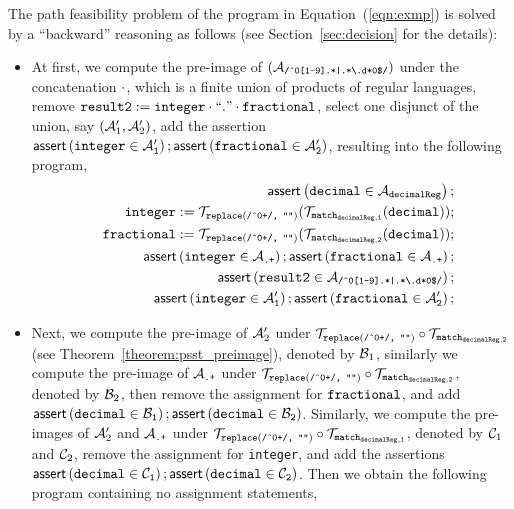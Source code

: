 The path feasibility problem of the program in Equation~(\ref{eqn:exmp}) is solved by a ``backward'' reasoning as follows (see Section~\ref{sec:decision} for the details):  
\begin{itemize}
\item At first, we compute the pre-image of $(\mathcal{A}_{\scriptsize\mbox{\tt /\^{}0[1-9].*|.*{\scriptsize\textbackslash}.d*0\$/}})$ under the concatenation $\cdot$, which is a finite union of products of regular languages, remove $\tt result2 := integer \cdot ``." \cdot fractional$, select one disjunct of the union, say $(\mathcal{A}'_1, \mathcal{A}'_2)$, add the assertion $\textsf{assert}\left(\tt integer \in \mathcal{A}'_1\right);\textsf{assert}\left(\tt fractional \in \mathcal{A}'_2\right)$, resulting into the following program,
\begin{eqnarray}\label{eqn:exmp-2}
& & \textsf{assert}\left(\tt decimal \in \mathcal{A}_{decimalReg}\right);\nonumber \\
& & \tt integer  := \tt  \mathcal{T}_{\tt replace(\mbox{\scriptsize \tt /\^{}0+/, ""})}(\mathcal{T}_{\tt match_{decimalReg,1}}(decimal));\nonumber \\
& & \tt fractional  := \tt  \mathcal{T}_{\scriptsize\tt replace(\mbox{\tt /\^{}0+/, ""})}(\mathcal{T}_{\tt match_{decimalReg,2}}(decimal));\nonumber \\
&&  \textsf{assert}\left(\tt integer \in \mathcal{A}_{\scriptsize\mbox{\tt.+}}\right); 
  \textsf{assert}\left(\tt fractional \in \mathcal{A}_{\scriptsize\mbox{\tt.+}}\right); \nonumber\\
 && \textsf{assert}\left(\tt result2 \in \mathcal{A}_{\scriptsize\mbox{\tt /\^{}0[1-9].*|.*{\scriptsize\textbackslash}.d*0\$/}}\right); \nonumber\\
  && \textsf{assert}\left(\tt integer \in \mathcal{A}'_1\right);\textsf{assert}\left(\tt fractional \in \mathcal{A}'_2\right); 
\end{eqnarray}
%
\item Next, we compute the pre-image of $\mathcal{A}'_2$ under $\mathcal{T}_{\tt replace(\mbox{\scriptsize \tt /\^{}0+/, ""})} \circ \mathcal{T}_{\tt match_{decimalReg,2}}$ (see Theorem~\ref{theorem:psst_preimage}), denoted by $\mathcal{B}_1$, similarly we compute the pre-image of $\mathcal{A}_{\scriptsize\mbox{\tt.+}}$ under $\mathcal{T}_{\tt replace(\mbox{\scriptsize \tt /\^{}0+/, ""})} \circ \mathcal{T}_{\tt match_{decimalReg,2}}$,  denoted by $\mathcal{B}_2$, then remove the assignment for  $\tt fractional$, and add $\textsf{assert}\left(\tt decimal \in \mathcal{B}_1\right);\textsf{assert}\left(\tt decimal \in \mathcal{B}_2\right)$. Similarly, we compute the pre-images of $\mathcal{A}'_2$ and $\mathcal{A}_{\scriptsize\mbox{\tt.+}}$ under $\mathcal{T}_{\tt replace(\mbox{\scriptsize \tt /\^{}0+/, ""})} \circ \mathcal{T}_{\tt match_{decimalReg, 1}}$, denoted by $\mathcal{C}_1$ and $\mathcal{C}_2$, remove the assignment for {\tt integer}, and add the assertions $\textsf{assert}\left(\tt decimal \in \mathcal{C}_1\right);\textsf{assert}\left(\tt decimal \in \mathcal{C}_2\right)$. Then we obtain the following program containing no assignment statements, 

\end{itemize}
